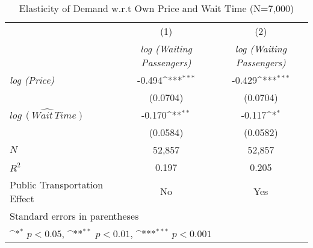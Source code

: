 
\begin{table}[h]
\caption{Elasticity of Demand w.r.t Own Price and Wait Time (N=7,000)}\label{tab:robust_7000}\\

{
\def\sym#1{\ifmmode^{#1}\else\(^{#1}\)\fi}
\begin{center}
\begin{tabular}{l*{2}{c}}
\hline\hline
            &\multicolumn{1}{c}{(1)}&\multicolumn{1}{c}{(2)}\\
            &\multicolumn{1}{c}{\textit{log (Waiting Passengers)}}&\multicolumn{1}{c}{\textit{log (Waiting Passengers)}}\\
\hline
\textit{log (Price)}      &      -0.494\sym{***}&      -0.429\sym{***}\\
            &    (0.0704)         &    (0.0704)         \\
[1em]
${\widehat{log\, (Wait\, Time)}}$&      -0.170\sym{**} &     -0.117\sym{*}   \\
            &    (0.0584)         &    (0.0582)         \\
\hline
\(N\)       &       52,857         &       52,857         \\
\(R^{2}\)   &       0.197         &       0.205         \\
Public Transportation Effect &       No            &    Yes                 \\
\hline\hline
\multicolumn{3}{l}{\footnotesize Standard errors in parentheses}\\
\multicolumn{3}{l}{\footnotesize \sym{*} \(p<0.05\), \sym{**} \(p<0.01\), \sym{***} \(p<0.001\)}\\
\end{tabular}
\end{center}
}


\end{table}

